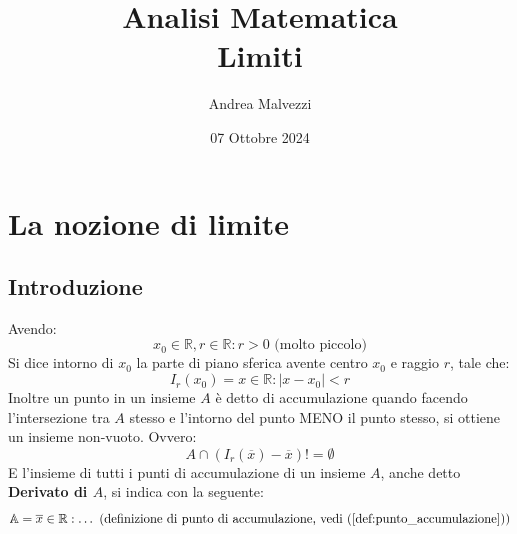 \documentclass[12pt]{article}
\title{\textbf{Analisi Matematica\\Limiti}}
\date{07 Ottobre 2024}
\author{Andrea Malvezzi}
\begin{document}
\maketitle
\pagebreak
\tableofcontents
\pagebreak
\section{La nozione di limite}
\subsection{Introduzione}
Avendo:
\[
    x_0 \in \mathbb{R}, r \in \mathbb{R} : r > 0 \text{ (molto piccolo)}
\]
Si dice intorno di $x_0$ la parte di piano sferica avente centro $x_0$ e raggio $r$, tale che:
\begin{equation}
    I_r(x_0) = x \in \mathbb{R} : | x - x_0 | < r \label{def:intorno}
\end{equation}
Inoltre un punto in un insieme $A$ è detto di accumulazione quando facendo l'intersezione tra $A$ stesso e l'intorno del punto MENO il punto stesso, si ottiene un insieme non-vuoto. Ovvero:
\begin{equation}
    A \cap (I_r(\overline{x}) - {\overline{x}}) != \emptyset \label{def:punto_accumulazione}
\end{equation}
E l'insieme di tutti i punti di accumulazione di un insieme $A$, anche detto \textbf{Derivato di $A$}, si indica con la seguente:
\begin{equation}
    \mathbb{A} = {\overline{x} \in \mathbb{R} : \dots \text{ (definizione di punto di accumulazione, vedi (\ref{def:punto_accumulazione}))}} 
\end{equation}
\pagebreak
\end{document}
